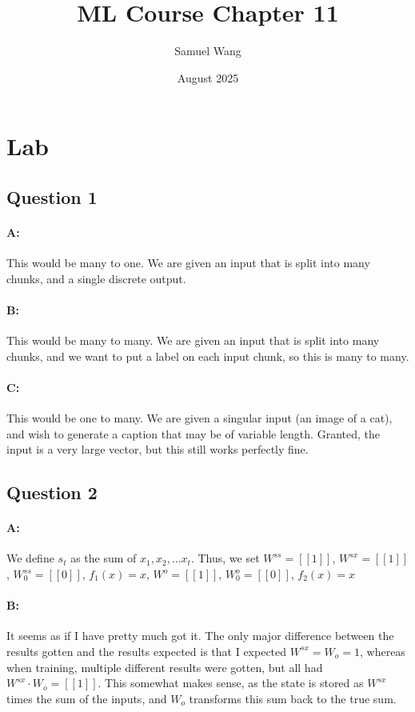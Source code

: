 \documentclass{article}
\title{ML Course Chapter 11}
\author{Samuel Wang}
\date{August 2025}
\begin{document}
\maketitle

\section{Lab}

\subsection{Question 1}

\paragraph{A: } This would be many to one. We are given an input that is split into many chunks, and a single discrete output.

\paragraph{B: } This would be many to many. We are given an input that is split into many chunks, and we want to put a label on each input chunk, so this is many to many.

\paragraph{C: } This would be one to many. We are given a singular input (an image of a cat), and wish to generate a caption that may be of variable length. Granted, the input is a very large vector, but this still works perfectly fine.

\subsection{Question 2}

\paragraph{A: } We define $s_t$ as the sum of $x_1, x_2, \dots x_t$. Thus, we set $W^{ss}=[[1]]$, $W^{sx}=[[1]]$, $W_0^{ss}=[[0]]$, $f_1(x)=x$, $W^o=[[1]]$, $W_0^o=[[0]]$, $f_2(x)=x$

\paragraph{B: } It seems as if I have pretty much got it. The only major difference between the results gotten and the results expected is that I expected $W^{sx}=W_o=1$, whereas when training, multiple different results were gotten, but all had $W^{sx}\cdot W_o=[[1]]$. This somewhat makes sense, as the state is stored as $W^{sx}$ times the sum of the inputs, and $W_o$ transforms this sum back to the true sum.
\end{document}
